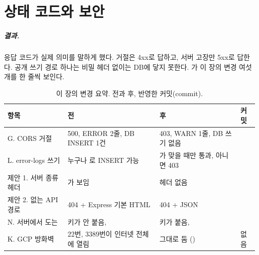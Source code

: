 \chapter{상태 코드와 보안}\label{ch:status-security}

\paragraph{결과.}
응답 코드가 실제 의미를 말하게 했다.
거절은 4xx로 답하고, 서버 고장만 5xx로 답한다.
공개 쓰기 경로 하나는 비밀 헤더 없이는 DB에 닿지 못한다.
가 이 장의 변경 여섯 개를 한 줄씩 보인다.

\begin{table}[H]
  \caption{이 장의 변경 요약. 전과 후, 반영한 커밋(commit).}\label{tab:05-summary}
  \small
  \begin{tabularx}{\linewidth}{l Y Y l}
    \toprule
    항목 & 전 & 후 & 커밋 \\
    \midrule
    G. CORS 거절 & 500, ERROR 2줄, DB INSERT 1건 & 403, WARN 1줄, DB 쓰기 없음 &  \\
    \midrule
    L. error-logs 쓰기 & 누구나 로 INSERT 가능 & 가 맞을 때만 통과, 아니면 403 &  \\
    \midrule
    제안 1. 서버 종류 헤더 & 가 보임 & 헤더 없음 &  \\
    \midrule
    제안 2. 없는 API 경로 & 404 + Express 기본 HTML & 404 + JSON &  \\
    \midrule
    N. 서버에서 도는  & 키가 안 붙음,  & 키가 붙음,  &  \\
    \midrule
    K. GCP 방화벽 & 22번, 3389번이 인터넷 전체에 열림 & 그대로 둠 () & 없음 \\
    \bottomrule
  \end{tabularx}
\end{table}

